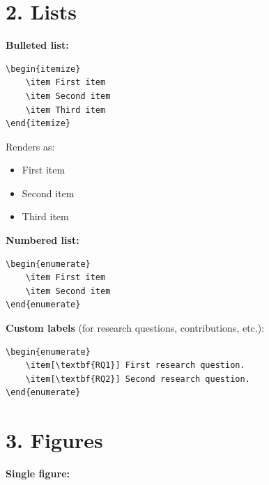 \section*{2. Lists}

\noindent
\textbf{Bulleted list:}

\begin{verbatim}
\begin{itemize}
    \item First item
    \item Second item
    \item Third item
\end{itemize}
\end{verbatim}

Renders as:
\begin{itemize}
    \item First item
    \item Second item
    \item Third item
\end{itemize}

\noindent
\textbf{Numbered list:}

\begin{verbatim}
\begin{enumerate}
    \item First item
    \item Second item
\end{enumerate}
\end{verbatim}

\noindent
\textbf{Custom labels} (for research questions, contributions, etc.):

\begin{verbatim}
\begin{enumerate}
    \item[\textbf{RQ1}] First research question.
    \item[\textbf{RQ2}] Second research question.
\end{enumerate}
\end{verbatim}


\section*{3. Figures}

\noindent
\textbf{Single figure:}

